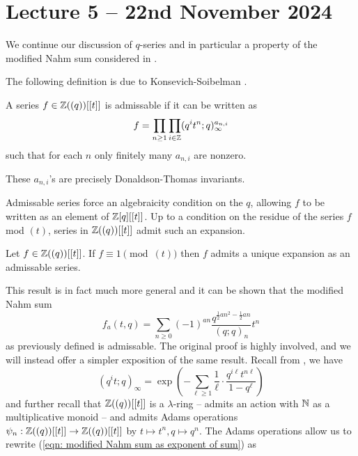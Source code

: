 \section{Lecture 5 -- 22nd November 2024}\label{sec: lecture 5}
We continue our discussion of $q$-series and in particular a property of the modified Nahm sum considered in .

The following definition is due to Konsevich-Soibelman \cite{DTInvariants}.
\begin{definition}\label{def: admissable series}
    A series $f\in\mathbb{Z}((q))[[t]]$ is admissable if it can be written as 
    $$f=\prod_{n\geq1}\prod_{i\in\mathbb{Z}}(q^{i}t^{n};q)_{\infty}^{a_{n,i}}$$
    such that for each $n$ only finitely many $a_{n,i}$ are nonzero. 
\end{definition}
\begin{remark}
    These $a_{n,i}$'s are precisely Donaldson-Thomas invariants. 
\end{remark}
Admissable series force an algebraicity condition on the $q$, allowing $f$ to be written as an element of $\mathbb{Z}[q][[t]]$. Up to a condition on the residue of the series $f$ mod $(t)$, series in $\mathbb{Z}((q))[[t]]$ admit such an expansion. 
\begin{proposition}
    Let $f\in\mathbb{Z}((q))[[t]]$. If $f\equiv1\pmod{(t)}$ then $f$ admits a unique expansion as an admissable series. 
\end{proposition}
This result is in fact much more general and it can be shown that the modified Nahm sum 
$$f_{a}(t,q)=\sum_{n\geq0}(-1)^{an}\frac{q^{\frac{1}{2}an^{2}-\frac{1}{2}an}}{(q;q)_{n}}t^{n}$$
as previously defined is admissable. The original proof is highly involved, and we will instead offer a simpler exposition of the same result. Recall from , we have 
\begin{equation}\label{eqn: modified Nahm sum as exponent of sum}
    (q^{i}t;q)_{\infty}=\exp\left(-\sum_{\ell\geq 1}\frac{1}{\ell}\cdot\frac{q^{i\ell}t^{n\ell}}{1-q^{\ell}}\right)
\end{equation}
and further recall that $\mathbb{Z}((q))[[t]]$ is a $\lambda$-ring -- admits an action with $\mathbb{N}$ as a multiplicative monoid -- and admits Adams operations $\psi_{n}:\mathbb{Z}((q))[[t]]\to\mathbb{Z}((q))[[t]]$ by $t\mapsto t^{n},q\mapsto q^{n}$. The Adams operations allow us to rewrite (\ref{eqn: modified Nahm sum as exponent of sum}) as 
